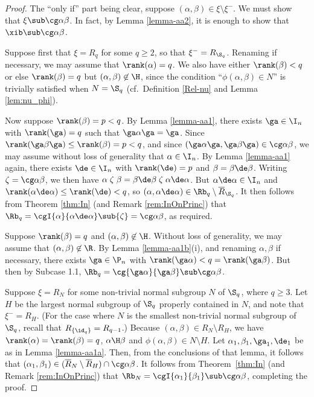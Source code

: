 \begin{proof} The ``only if'' part being clear, suppose $(\alpha,\beta)\in\xi\setminus\xi^-$.  We must show that $\xi\sub\cg\alpha\beta$.  In fact, by Lemma \ref{lemma-aa2}, it is enough to show that $\xib\sub\cg\alpha\beta$.

\bigskip{}  Suppose first that $\xi=R_q$ for some $q\geq2$, so that $\xi^-=R_{\S_q}$.  Renaming if necessary, we may assume that $\rank(\alpha)=q$.  We also have either $\rank(\beta)<q$ or else $\rank(\beta)=q$ but $(\alpha,\beta)\not\in{\H}$, since the condition ``$\phi(\alpha,\beta)\in N$'' is trivially satisfied when $N=\S_q$ (cf.~Definition \ref{Rel-nu} and Lemma \ref{lem:nu_phi}).

\bigskip{}  Now suppose $\rank(\beta)=p<q$.  By Lemma \ref{lemma-aa1}, there exists $\ga\in\I_n$ with $\rank(\ga)=q$ such that $\ga\alpha\ga=\ga$.  Since $\rank(\ga\beta\ga)\leq\rank(\beta)=p<q$, and since $(\ga\alpha\ga,\ga\beta\ga)\in\cg\alpha\beta$, we may assume without loss of generality that $\alpha\in\I_n$.  By Lemma \ref{lemma-aa1} again, there exists $\de\in\I_n$ with $\rank(\de)=p$ and $\beta=\beta\de\beta$.  Writing ${\zeta}=\cg\alpha\beta$, we then have
$\alpha \mathrel\zeta \beta = \beta\de\beta \mathrel\zeta \alpha\de\alpha$.
But $\alpha\de\alpha\in\I_n$ and $\rank(\alpha\de\alpha)\leq\rank(\de)<q$, so $(\alpha,\alpha\de\alpha)\in\Rb_q\setminus\overline{R}_{\S_q}$.  It then follows from Theorem \ref{thm:In} (and Remark \ref{rem:InOnPrinc}) that $\Rb_q=\cgI{\alpha}{\alpha\de\alpha}\sub{\zeta}=\cg\alpha\beta$, as required.

\bigskip{}  Suppose $\rank(\beta)=q$ and $(\alpha,\beta)\not\in{\H}$.  Without loss of generality, we may assume that $(\alpha,\beta)\not\in{\R}$.  By Lemma \ref{lemma-aa1b}(i), and renaming $\alpha,\beta$ if necessary, there exists $\ga\in\P_n$ with $\rank(\ga\alpha)<q=\rank(\ga\beta)$.  But then by Subcase 1.1, $\Rb_q=\cg{\ga\alpha}{\ga\beta}\sub\cg\alpha\beta$.

\bigskip{}  Suppose $\xi=R_N$ for some non-trivial normal subgroup $N$ of $\S_q$, where $q\geq3$.  Let $H$ be the largest normal subgroup of $\S_q$ properly contained in $N$, and note that $\xi^-=R_H$.  (For the case where $N$ is the smallest non-trivial normal subgroup of $\S_q$, recall that $R_{\{\id_q\}}=R_{q-1}$.)  Because $(\alpha,\beta)\in R_N\setminus R_H$, we have $\rank(\alpha)=\rank(\beta)=q$, $\alpha\H\beta$ and $\phi(\alpha,\beta)\in N\setminus H$.  Let $\alpha_1,\beta_1,\ga_1,\de_1$ be as in Lemma \ref{lemma-aa1a}.  Then, from the conclusions of that lemma, it follows that $(\alpha_1,\beta_1)\in(\overline{R}_N\setminus\overline{R}_H)\cap\cg\alpha\beta$.  It follows from Theorem~\ref{thm:In} (and Remark \ref{rem:InOnPrinc}) that $\Rb_N=\cgI{\alpha_1}{\beta_1}\sub\cg\alpha\beta$, completing the proof. \end{proof}



